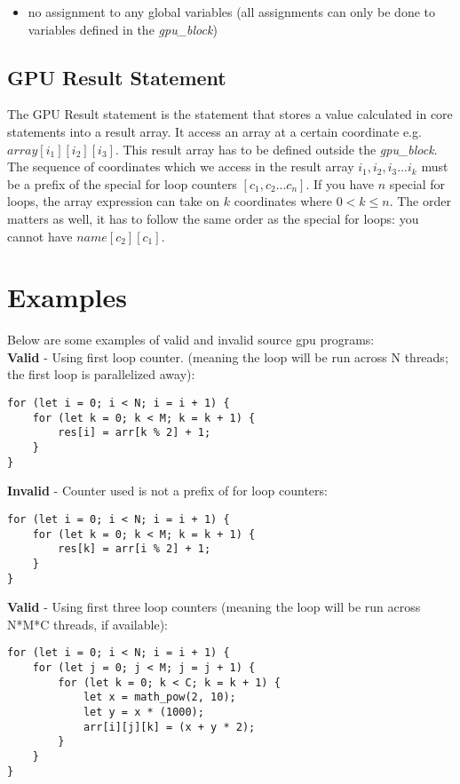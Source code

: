 \begin{itemize}
    \item{no assignment to any global variables (all assignments can only be done to variables defined in the \textit{gpu\_block}})
\end{itemize}

\subsection*{GPU Result Statement}

The GPU Result statement is the statement that stores a value calculated in core statements into a result array. It access an array at a certain coordinate e.g. ${array[{i_1}][{i_2}][{i_3}]}$. This result array has to be defined outside the \textit{gpu\_block}.\\

The sequence of coordinates which we access in the result array ${{i_1}, {i_2}, {i_3} ... i_{k}}$ must be a prefix of the special for loop counters ${[c_1,c_2 ... c_n]}$. If you have ${n}$ special for loops, the array expression can take on ${k}$ coordinates where ${0 < k \leq n}$. The order matters as well, it has to follow the same order as the special for loops: you cannot have ${name[c_2][c_1]}$.

\newpage

\section*{Examples}

Below are some examples of valid and invalid source gpu programs:\\

\textbf{Valid} - Using first loop counter. (meaning the loop will be run across N threads; the first loop is parallelized away):
\begin{verbatim}
for (let i = 0; i < N; i = i + 1) {
    for (let k = 0; k < M; k = k + 1) {
        res[i] = arr[k % 2] + 1;
    }
}
\end{verbatim}

\textbf{Invalid} - Counter used is not a prefix of for loop counters:
\begin{verbatim}
for (let i = 0; i < N; i = i + 1) {
    for (let k = 0; k < M; k = k + 1) {
        res[k] = arr[i % 2] + 1;
    }
}
\end{verbatim}

\textbf{Valid} - Using first three loop counters (meaning the loop will be run across N*M*C threads, if available):
\begin{verbatim}
for (let i = 0; i < N; i = i + 1) {
    for (let j = 0; j < M; j = j + 1) {
        for (let k = 0; k < C; k = k + 1) {
            let x = math_pow(2, 10);
            let y = x * (1000);
            arr[i][j][k] = (x + y * 2);
        }
    }
}
\end{verbatim}

